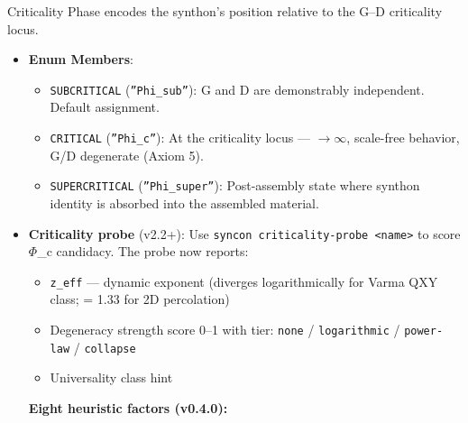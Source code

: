 \documentclass[12pt,a4paper]{article}
\begin{document}
Criticality Phase encodes the synthon's position relative to the G--D criticality locus.

\begin{itemize}
    \item 
    \textbf{Enum Members}:

    \begin{itemize}
    \item \texttt{SUBCRITICAL} (\texttt{''Phi\_sub''}): G and D are demonstrably independent. Default assignment.
    \item \texttt{CRITICAL} (\texttt{''Phi\_c''}): At the criticality locus --- \xi$\rightarrow$$\infty$, scale-free behavior, G/D degenerate (Axiom 5).
    \item \texttt{SUPERCRITICAL} (\texttt{''Phi\_super''}): Post-assembly state where synthon identity is absorbed into the assembled material.
\end{itemize}

    \item 
    \textbf{Criticality probe} (v2.2+): Use \texttt{syncon criticality-probe \textless{}name\textgreater{}} to score $\Phi$\_c candidacy. The probe now reports:

    \begin{itemize}
    \item \texttt{z\_eff} --- dynamic exponent (diverges logarithmically for Varma QXY class; = 1.33 for 2D percolation)
    \item Degeneracy strength score 0--1 with tier: \texttt{none} / \texttt{logarithmic} / \texttt{power-law} / \texttt{collapse}
    \item Universality class hint
\end{itemize}

    \textbf{Eight heuristic factors (v0.4.0):}


\end{itemize}
\end{document}
